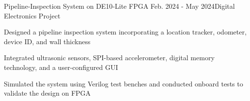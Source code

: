 \begin{rSubsection}{Pipeline‑Inspection System on DE10‑Lite FPGA} {Feb. 2024 - May 2024}{Digital Electronics Project}{}
\item Designed a pipeline inspection system incorporating a location tracker, odometer, device ID, and wall thickness
\item Integrated ultrasonic sensors, SPI-based accelerometer, digital memory technology, and a user-configured GUI
\item Simulated the system using Verilog test benches and conducted onboard tests to validate the design on FPGA
\end{rSubsection}
